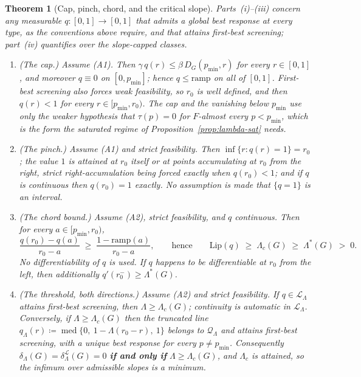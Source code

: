 \documentclass[10pt,a4paper]{amsart}
\newtheorem{theorem}{Theorem}
\begin{document}
\begin{theorem}[Cap, pinch, chord, and the critical slope]\label{thm:critical-slope}
Parts~(i)--(iii) concern any measurable $q : [0,1] \to [0,1]$ that admits a global best response at every type, as the conventions above require, and that attains first-best screening; part~(iv) quantifies over the slope-capped classes.
\begin{enumerate}
\item[(i)] \emph{(The cap.)} Assume (A1). Then $\gamma\, q(r) \le \beta\, D_G(p_{\min},r)$ for every $r \in [0,1]$, and moreover $q \equiv 0$ on $[0,p_{\min}]$; hence $q \le \mathrm{ramp}$ on all of $[0,1]$. First-best screening also forces weak feasibility, so $r_0$ is well defined, and then $q(r) < 1$ for every $r \in [p_{\min},r_0)$. The cap and the vanishing below $p_{\min}$ use only the weaker hypothesis that $\tau(p) = 0$ for $F$-almost every $p < p_{\min}$, which is the form the saturated regime of Proposition~\ref{prop:lambda-sat} needs.
\item[(ii)] \emph{(The pinch.)} Assume (A1) and strict feasibility. Then $\inf\{r : q(r) = 1\} = r_0$; the value $1$ is attained at $r_0$ itself or at points accumulating at $r_0$ from the right, strict right-accumulation being forced exactly when $q(r_0) < 1$; and if $q$ is continuous then $q(r_0) = 1$ exactly. No assumption is made that $\{q = 1\}$ is an interval.
\item[(iii)] \emph{(The chord bound.)} Assume (A2), strict feasibility, and $q$ continuous. Then for every $a \in [p_{\min},r_0)$,
\[
\frac{q(r_0)-q(a)}{r_0-a} \;\ge\; \frac{1-\mathrm{ramp}(a)}{r_0-a}, \qquad\text{hence}\qquad \mathrm{Lip}(q) \;\ge\; \Lambda_c(G) \;\ge\; \Lambda^*(G) \;>\; 0 .
\]
No differentiability of $q$ is used. If $q$ happens to be differentiable at $r_0$ from the left, then additionally $q'(r_0^-) \ge \Lambda^*(G)$.
\item[(iv)] \emph{(The threshold, both directions.)} Assume (A2) and strict feasibility. If $q \in \mathcal L_\Lambda$ attains first-best screening, then $\Lambda \ge \Lambda_c(G)$; continuity is automatic in $\mathcal L_\Lambda$. Conversely, if $\Lambda \ge \Lambda_c(G)$ then the truncated line $q_\Lambda(r) \coloneqq \operatorname{med}\{0,\ 1-\Lambda(r_0-r),\ 1\}$ belongs to $\mathcal Q_\Lambda$ and attains first-best screening, with a unique best response for every $p \ne p_{\min}$. Consequently $\delta_\Lambda(G) = \delta^{\mathcal L}_\Lambda(G) = 0$ \textbf{if and only if} $\Lambda \ge \Lambda_c(G)$, and $\Lambda_c$ is attained, so the infimum over admissible slopes is a minimum.
\end{enumerate}
\end{theorem}
\end{document}
